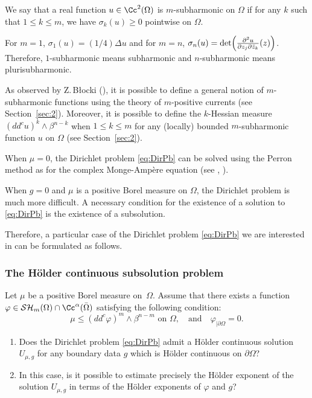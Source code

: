 We say that a real function $u \in \Cc^2 (\Omega)$ is $m$-subharmonic on $\Omega$ if for any $k$ such that $1 \leq k \leq m$, we have $\sigma_k (u) \geq 0$ pointwise on $\Omega$.

For $m= 1$, $\sigma_1 (u) = (1 \slash 4) \Delta u$ and for $m = n$, $\sigma_n (u) = \det \Bigl(\frac{\partial^2 u }{\partial z_j \partial \bar{z}_k} (z)\Bigr)$.
Therefore, $1$-subharmonic means subharmonic and $n$-subharmonic means plurisubharmonic.

As observed by Z.\,B\l ocki (\cite{Bl05}), it is possible to define a general notion of $m$-subharmonic functions using the theory of $m$-positive currents (see Section~\ref{sec:2}). Moreover, it is possible to define the $k$-Hessian measure $(dd^c u)^k \wedge \beta^{n - k}$ when \hbox{$1 \leq k \leq m$} for any (locally) bounded $m$-subharmonic function $u$ on $\Omega$ (see Section~\ref{sec:2}).

When $\mu = 0$, the Dirichlet problem \eqref{eq:DirPb} can be solved using the Perron method as for the complex Monge-Ampère equation (see \cite{Bl05}, \cite{Ch16a}).

When $g = 0$ and $\mu$ is a positive Borel measure on $\Omega$, the Dirichlet problem is much more difficult. A necessary condition for the existence of a solution to \eqref{eq:DirPb} is the existence of a subsolution.

Therefore, a particular case of the Dirichlet problem \eqref{eq:DirPb} we are interested in can be formulated as follows.

\subsubsection*{The Hölder continuous subsolution problem}
Let $\mu$ be a positive Borel measure on~$\Omega$. Assume that there exists a function $\varphi \in \mathcal{SH}_m (\Omega) \cap \Cc^{\alpha} (\bar{\Omega})$ satisfying the following condition:
\begin{equation} \label{eq:subsolution}
\mu \leq (dd^c \varphi)^m \wedge \beta^{n - m}\text{ on }\Omega, \quad \text{and}\quad \varphi_{\mid \partial \Omega} = 0.
\end{equation}

\begin{enumerate}
\item
Does the Dirichlet problem \eqref{eq:DirPb} admit a Hölder continuous solution $U_{\mu,g}$ for any boundary data $g$ which is Hölder continuous on $\partial{\Omega}$?

\item
In this case, is it possible to estimate precisely the Hölder exponent of the solution $U_{\mu,g}$ in terms of the Hölder exponents of $\varphi$ and $g$?
\end{enumerate}


